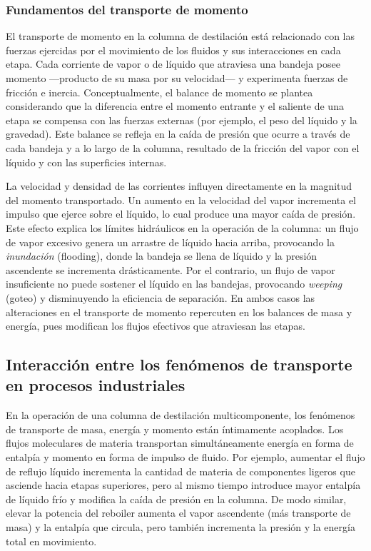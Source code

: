 \subsubsection{Fundamentos del transporte de momento}
El transporte de momento en la columna de destilación está relacionado con las fuerzas ejercidas por el movimiento de los fluidos y sus interacciones en cada etapa. Cada corriente de vapor o de líquido que atraviesa una bandeja posee momento —producto de su masa por su velocidad— y experimenta fuerzas de fricción e inercia. Conceptualmente, el balance de momento se plantea considerando que la diferencia entre el momento entrante y el saliente de una etapa se compensa con las fuerzas externas (por ejemplo, el peso del líquido y la gravedad). Este balance se refleja en la caída de presión que ocurre a través de cada bandeja y a lo largo de la columna, resultado de la fricción del vapor con el líquido y con las superficies internas.

La velocidad y densidad de las corrientes influyen directamente en la magnitud del momento transportado. Un aumento en la velocidad del vapor incrementa el impulso que ejerce sobre el líquido, lo cual produce una mayor caída de presión. Este efecto explica los límites hidráulicos en la operación de la columna: un flujo de vapor excesivo genera un arrastre de líquido hacia arriba, provocando la \emph{inundación} (flooding), donde la bandeja se llena de líquido y la presión ascendente se incrementa drásticamente. Por el contrario, un flujo de vapor insuficiente no puede sostener el líquido en las bandejas, provocando \emph{weeping} (goteo) y disminuyendo la eficiencia de separación. En ambos casos las alteraciones en el transporte de momento repercuten en los balances de masa y energía, pues modifican los flujos efectivos que atraviesan las etapas.

\subsection{Interacción entre los fenómenos de transporte en procesos industriales}
En la operación de una columna de destilación multicomponente, los fenómenos de transporte de masa, energía y momento están íntimamente acoplados. Los flujos moleculares de materia transportan simultáneamente energía en forma de entalpía y momento en forma de impulso de fluido. Por ejemplo, aumentar el flujo de reflujo líquido incrementa la cantidad de materia de componentes ligeros que asciende hacia etapas superiores, pero al mismo tiempo introduce mayor entalpía de líquido frío y modifica la caída de presión en la columna. De modo similar, elevar la potencia del reboiler aumenta el vapor ascendente (más transporte de masa) y la entalpía que circula, pero también incrementa la presión y la energía total en movimiento.

